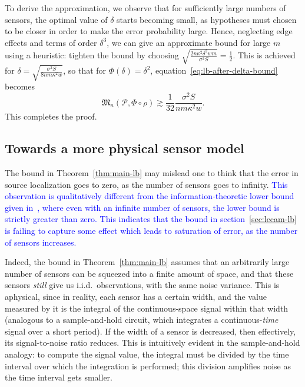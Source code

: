 \documentclass[conference]{IEEEtran}
\newcommand{\Phiorho}{\Phi\!\circ\!\rho}
\begin{document}
\begin{IEEEproof}
To derive the approximation, we observe that for sufficiently large numbers of
sensors, the optimal value of $\delta$ starts becoming small, as hypotheses
must chosen to be closer in order to make the error probability large. Hence,
neglecting edge effects and terms of order $\delta^3$, we can give an
approximate bound for large $m$ using a heuristic: tighten the bound by
choosing $\sqrt{\frac{2n\kappa^2\delta^2wm}{\sigma^2 S}} = \frac{1}{2}$. This
is achieved for $\delta = \sqrt{\frac{\sigma^2 S}{8nm\kappa^2 w}}$, so that for
$\Phi(\delta) = \delta^2$, equation~\eqref{eq:lb-after-delta-bound} becomes
\begin{equation}
	\mathfrak{M}_n(\mathcal{P}, \Phiorho) \gtrsim \frac{1}{32} \frac{\sigma^2 S}{nm\kappa^2 w}.
\end{equation}
This completes the proof.
\end{IEEEproof}

\subsection{Towards a more physical sensor model}

The bound in Theorem~\ref{thm:main-lb} may mislead one to think that the error
in source localization goes to zero, as the number of sensors goes to infinity.
\textcolor{blue}{
This observation is qualitatively different from the information-theoretic
lower bound given in~\cite{Grover2016Fundamental}, where even with an infinite
number of sensors, the lower bound is strictly greater than zero. This
indicates that the bound in section~\ref{sec:lecam-lb} is failing to capture
some effect which leads to saturation of error, as the number of sensors
increases.
}

Indeed, the bound in Theorem~\ref{thm:main-lb} assumes that an arbitrarily
large number of sensors can be squeezed into a finite amount of space, and that
these sensors \emph{still} give us i.i.d.\ observations, with the same noise
variance. This is aphysical, since in reality, each sensor has a certain width,
and the value measured by it is the integral of the continuous-space signal
within that width (analogous to a sample-and-hold circuit, which integrates a
continuous-\emph{time} signal over a short period).  If the width of a sensor
is decreased, then effectively, its signal-to-noise ratio reduces.  This is
intuitively evident in the sample-and-hold analogy: to compute the signal
value, the integral must be divided by the time interval over which the
integration is performed; this division amplifies noise as the time interval
gets smaller.
\end{document}
